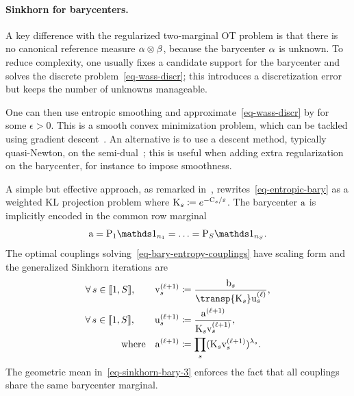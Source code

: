 \paragraph{Sinkhorn for barycenters.}

A key difference with the regularized two-marginal OT problem is that there is no canonical reference measure $\alpha\otimes\beta$, because the barycenter $\alpha$ is unknown. To reduce complexity, one usually fixes a candidate support for the barycenter and solves the discrete problem~\eqref{eq-wass-discr}; this introduces a discretization error but keeps the number of unknowns manageable.

One can then use entropic smoothing and approximate~\eqref{eq-wass-discr} by
for some $\epsilon>0$. This is a smooth convex minimization problem, which can be tackled using gradient descent~\cite{CuturiBarycenter}. An alternative is to use a descent method, typically quasi-Newton, on the semi-dual~\cite{2016-Cuturi-siims}; this is useful when adding extra regularization on the barycenter, for instance to impose smoothness.

A simple but effective approach, as remarked in~\cite{2015-benamou-cisc}, rewrites~\eqref{eq-entropic-bary} as a weighted KL projection problem
where $\mathrm{K}_s\coloneqq e^{-\mathrm{C}_s/\varepsilon}$. The barycenter $\mathrm{a}$ is implicitly encoded in the common row marginal
\[
	\a=\P_1\ones_{n_1}=\ldots=\P_S\ones_{n_S}.
\]
The optimal couplings solving~\eqref{eq-bary-entropy-couplings} have scaling form
and the generalized Sinkhorn iterations are
\begin{align}
	\foralls s\in\range{1,S},\qquad
	\itt{\vD}_s
	&\eqdef
	\frac{\b_s}{\transp{\K_s}\it{\uD}_s},
	\label{eq-sinkhorn-bary}
	\\
	\foralls s\in\range{1,S},\qquad
	\itt{\uD}_s
	&\eqdef
	\frac{\itt{\a}}{\K_s\itt{\vD}_s},
	\label{eq-sinkhorn-bary-2}
	\\
	\qwhereq
	\itt{\a}
	&\eqdef
	\prod_s(\K_s\itt{\vD}_s)^{\la_s}.
	\label{eq-sinkhorn-bary-3}
\end{align}
The geometric mean in~\eqref{eq-sinkhorn-bary-3} enforces the fact that all couplings share the same barycenter marginal.


